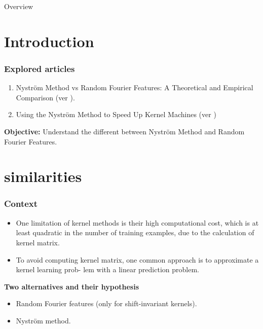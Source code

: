 


\begin{frame}{Overview}
  \tableofcontents
\end{frame}
%

\section{Introduction}
\begin{frame}
  \frametitle{Explored articles}
\begin{enumerate}
  \item Nyström Method vs Random Fourier Features: A Theoretical and Empirical Comparison (ver \cite{NystromVSRandomFourierFeatures}).
  \item Using the Nyström Method to Speed Up Kernel Machines (ver \cite{NystromMethodToSpeedUpKernelMachines})
\end{enumerate}

\textbf{Objective:} Understand the different between Nyström Method and  Random Fourier Features. 
  
\end{frame}

\section {similarities}
\begin{frame}
  \frametitle{Context}

\begin{itemize}
  \item One limitation of kernel methods is their high computational cost, which is at least quadratic in the
number of training examples, due to the calculation of kernel matrix.
  \item To avoid computing kernel matrix, one common approach is to approximate a kernel learning prob-
lem with a linear prediction problem. 
\end{itemize}

\bf{Two alternatives and their hypothesis}
\begin{itemize}
  \item Random Fourier features  (only for shift-invariant kernels).
  \item Nyström method. 
\end{itemize}

\end{frame}

